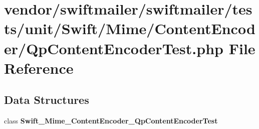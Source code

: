 \section{vendor/swiftmailer/swiftmailer/tests/unit/\+Swift/\+Mime/\+Content\+Encoder/\+Qp\+Content\+Encoder\+Test.php File Reference}
\label{_qp_content_encoder_test_8php}
\subsection*{Data Structures}
\begin{DoxyCompactItemize}
\item 
class {\bf Swift\+\_\+\+Mime\+\_\+\+Content\+Encoder\+\_\+\+Qp\+Content\+Encoder\+Test}
\end{DoxyCompactItemize}
